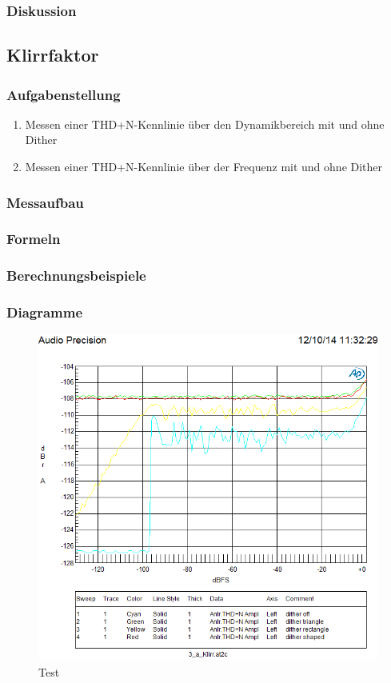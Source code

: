 \subsubsection{Diskussion}

\subsection{Klirrfaktor}
\subsubsection{Aufgabenstellung}
\begin{enumerate}
\item Messen einer THD+N-Kennlinie über den Dynamikbereich mit und ohne Dither
\item Messen einer THD+N-Kennlinie über der Frequenz mit und ohne Dither
\end{enumerate}

\subsubsection{Messaufbau}

\subsubsection{Formeln}

\subsubsection{Berechnungsbeispiele}

\subsubsection{Diagramme}
\begin{figure}[h!]
\centering
\includegraphics[width=\columnwidth]{figures/Aufg2/3a5.PNG} 
\caption{Test}
\end{figure}

